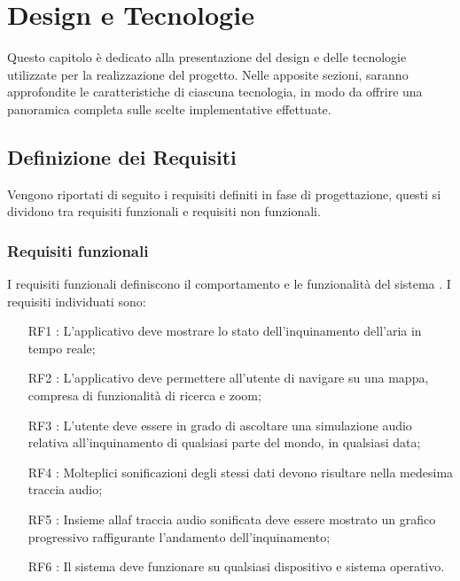 \clearpage{\pagestyle{empty}\cleardoublepage}
\chapter{Design e Tecnologie}                %

Questo capitolo è dedicato alla presentazione del design e delle tecnologie utilizzate per la realizzazione del progetto.
Nelle apposite sezioni, saranno approfondite le caratteristiche di ciascuna tecnologia, in modo da offrire una panoramica completa sulle scelte implementative effettuate.


\section{Definizione dei Requisiti}
Vengono riportati di seguito i requisiti definiti in fase di progettazione, questi si dividono tra requisiti funzionali e requisiti non funzionali.
\subsection{Requisiti funzionali}
I requisiti funzionali definiscono il comportamento e le funzionalità del sistema \cite{requisiti}.
I requisiti individuati sono:
\begin{itemize}
    \item[RF1]: L'applicativo deve mostrare lo stato dell'inquinamento dell'aria in tempo reale;
    \item[RF2]: L'applicativo deve permettere all'utente di navigare su una mappa, compresa di funzionalità di ricerca e zoom;
    \item[RF3]: L'utente deve essere in grado di ascoltare una simulazione audio relativa all'inquinamento di qualsiasi parte del mondo, in qualsiasi data;
    \item[RF4]: Molteplici sonificazioni degli stessi dati devono risultare nella medesima traccia audio;
    \item[RF5]: Insieme allaf traccia audio sonificata deve essere mostrato un grafico progressivo raffigurante l'andamento dell'inquinamento;
    \item[RF6]: Il sistema deve funzionare su qualsiasi dispositivo e sistema operativo.
\end{itemize}

